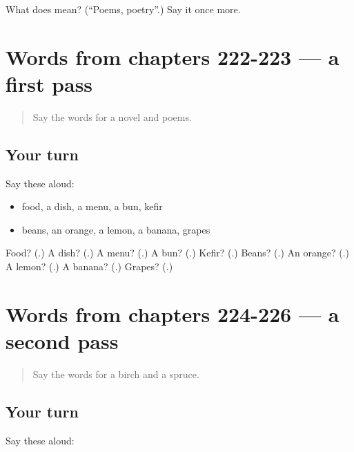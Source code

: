 \begin{tcolorbox}[breakable,colback=teal!4,colframe=teal!35!black,title={Before you move on}]
What does  mean? (\textquotedblleft{}Poems, poetry\textquotedblright{}.) Say it once more.
\end{tcolorbox}
\section[(dialogue)]{Words from chapters 222-223 — a first pass}

\label{lesson:RU-R226-first-pass-words-from-chapters-222-223}



\begin{quote}
Say the words for a novel and poems.
\end{quote}

\subsection*{Your turn}
Say these aloud:

\begin{itemize}
\raggedright
  \item food, a dish, a menu, a bun, kefir
  \item beans, an orange, a lemon, a banana, grapes
\end{itemize}

\begin{tcolorbox}[breakable,colback=teal!4,colframe=teal!35!black,title={Before you move on}]
Food? (\textbf{}.) A dish? (\textbf{}.) A menu? (\textbf{}.) A bun? (\textbf{}.) Kefir? (\textbf{}.) Beans? (\textbf{}.) An orange? (\textbf{}.) A lemon? (\textbf{}.) A banana? (\textbf{}.) Grapes? (\textbf{}.)
\end{tcolorbox}
\section[(dialogue)]{Words from chapters 224-226 — a second pass}

\label{lesson:RU-R226-second-pass-words-from-chapters-224-226}



\begin{quote}
Say the words for a birch and a spruce.
\end{quote}

\subsection*{Your turn}
Say these aloud:

